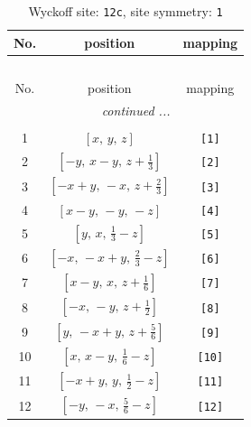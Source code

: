 \documentclass[fleqn,8pt]{jsarticle}
\begin{document}
\begin{longtable}{ccc}
\caption{Wyckoff site: {\tt 12c}, site symmetry: {\tt 1}}
 \\
 \hline \hline
No. & position & mapping \\ \hline \endfirsthead

\multicolumn{2}{l}{\tablename\ \thetable{}} \\
 \hline \hline
No. & position & mapping \\ \hline \endhead

 \hline \hline
\multicolumn{2}{r}{\footnotesize\it continued ...} \\ \endfoot

 \hline \hline
\multicolumn{2}{r}{} \\ \endlastfoot

1 & $\left[ x,\, y,\, z \right]$ & {\tt [1]} \\ \hline
2 & $\left[ - y,\, x - y,\, z + \frac{1}{3} \right]$ & {\tt [2]} \\ \hline
3 & $\left[ - x + y,\, - x,\, z + \frac{2}{3} \right]$ & {\tt [3]} \\ \hline
4 & $\left[ x - y,\, - y,\, - z \right]$ & {\tt [4]} \\ \hline
5 & $\left[ y,\, x,\, \frac{1}{3} - z \right]$ & {\tt [5]} \\ \hline
6 & $\left[ - x,\, - x + y,\, \frac{2}{3} - z \right]$ & {\tt [6]} \\ \hline
7 & $\left[ x - y,\, x,\, z + \frac{1}{6} \right]$ & {\tt [7]} \\ \hline
8 & $\left[ - x,\, - y,\, z + \frac{1}{2} \right]$ & {\tt [8]} \\ \hline
9 & $\left[ y,\, - x + y,\, z + \frac{5}{6} \right]$ & {\tt [9]} \\ \hline
10 & $\left[ x,\, x - y,\, \frac{1}{6} - z \right]$ & {\tt [10]} \\ \hline
11 & $\left[ - x + y,\, y,\, \frac{1}{2} - z \right]$ & {\tt [11]} \\ \hline
12 & $\left[ - y,\, - x,\, \frac{5}{6} - z \right]$ & {\tt [12]} \\
\end{longtable}
\end{document}
